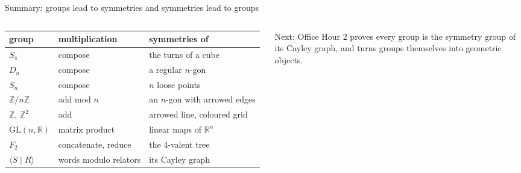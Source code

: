 \documentclass[aspectratio=169,10pt]{beamer}
\newcommand{\Z}{\mathbb{Z}}
\newcommand{\R}{\mathbb{R}}
\newcommand{\GL}{\mathrm{GL}}
\begin{document}
\begin{frame}{Summary: groups lead to symmetries and symmetries lead to groups}
\begin{columns}[T]
\scriptsize
\begin{tabular}{@{}lll@{}}
\toprule
group & multiplication & symmetries of\\
\midrule
$S_4$ & compose & the turns of a cube\\
$D_n$ & compose & a regular $n$-gon\\
$S_n$ & compose & $n$ loose points\\
$\Z/n\Z$ & add mod $n$ & an $n$-gon with arrowed edges\\
$\Z$, $\Z^2$ & add & arrowed line, coloured grid\\
$\GL(n,\R)$ & matrix product & linear maps of $\R^n$\\
$F_2$ & concatenate, reduce & the 4-valent tree\\
$\langle S\mid R\rangle$ & words modulo relators & its Cayley graph\\
\bottomrule
\end{tabular}
\vspace{6pt}
\begin{bigbox}
Next: Office Hour 2 proves every group is the symmetry group of its Cayley graph, and turns groups themselves into geometric objects.
\end{bigbox}
\centering\scalebox{0.52}{\figmap}
\end{columns}
\end{frame}
\end{document}
